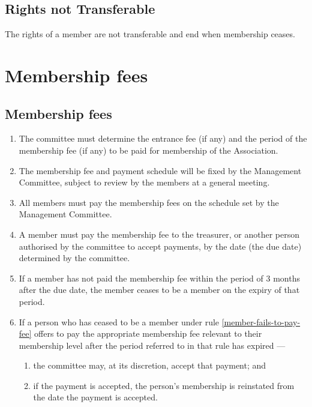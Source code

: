\documentclass[../constitution.tex]{subfiles}
\begin{document}
\subsection{Rights not Transferable} \label{rights-not-transferable}

The rights of a member are not transferable and end when membership ceases.


\section{Membership fees} \label{division-2-membership-fees}

\subsection{Membership fees} \label{membership-fees}

\begin{enumerate}

\item The committee must determine the entrance fee (if any) and the period of the membership fee (if any) to be paid for membership of the Association.
\item The membership fee and payment schedule will be fixed by the Management Committee, subject to review by the members at a general meeting.
\item All members must pay the membership fees on the schedule set by the Management Committee.
\item A member must pay the membership fee to the treasurer, or another person authorised by the committee to accept payments, by the date (the due date) determined by the committee. \label{member-must-pay-fee}
\item If a member has not paid the membership fee within the period of 3 months after the due date, the member ceases to be a member on the expiry of that period. \label{member-fails-to-pay-fee}
\item If a person who has ceased to be a member under rule \ref{member-fails-to-pay-fee} offers to pay the appropriate membership fee relevant to their membership level after the period referred to in that rule has expired ---

  \begin{enumerate}
  
  \item the committee may, at its discretion, accept that payment; and
  \item if the payment is accepted, the person's membership is reinstated from the date the payment is accepted.
  \end{enumerate}
\end{enumerate}
\end{document}
